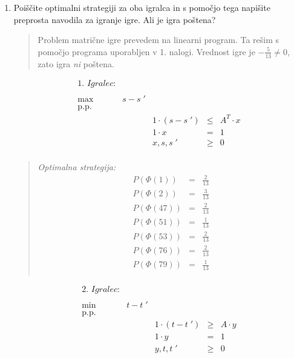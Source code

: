 \documentclass{article}
\begin{document}
\begin{enumerate}[label=\alph*)]
\item Poiščite optimalni strategiji za oba igralca in s pomočjo tega napišite preprosta
navodila za igranje igre. Ali je igra poštena?
    \begin{quote} 
    Problem matrične igre prevedem na linearni program. Ta rešim s pomočjo programa uporabljen v 1. nalogi. Vrednost igre je $-\frac{5}{13}\neq0$, zato igra \textit{ni} poštena.
    \end{quote}
\begin{center}
\begin{minipage}[t][4.5cm][t]{0.45\textwidth} %
\vspace{0pt} %
$$
\begin{array}{rrlll}{\textit{1. Igralec:}} \\\\
    \text{max} & s - s\;'&\\
    \text{p.p.} \\
    & & 1 \cdot (s-s\;') & \leq & A^T \cdot x \\
    & & 1 \cdot x & = & 1 \\
    & & x, s, s\;' & \ge &0 \\
\end{array}
$$

\begin{quote}
    \textit{Optimalna strategija:}
    \begingroup
    \setlength{\tabcolsep}{10pt} %
    \renewcommand{\arraystretch}{1.5} %
    $$
    \begin{array}{lcc}
    P(\Phi(1)) & = & \frac{2}{13} \\
    P(\Phi(2)) & = & \frac{3}{13} \\
    P(\Phi(47)) & = & \frac{2}{13} \\
    P(\Phi(51)) & = & \frac{1}{13} \\
    P(\Phi(53)) & = & \frac{2}{13} \\
    P(\Phi(76)) & = & \frac{2}{13} \\
    P(\Phi(79)) & = & \frac{1}{13} \\
    \end{array}
    $$
    \endgroup
    \end{quote}
\end{minipage}
\hfill
\begin{minipage}[t][4.5cm][t]{0.45\textwidth} %
\vspace{0pt} %
$$
\begin{array}{rrlll}{\textit{2. Igralec:}} \\\\
    \text{min} & t - t\;'&\\
    \text{p.p.} \\
    & & 1 \cdot (t-t\;') & \ge & A \cdot y \\
    & & 1 \cdot y & = & 1 \\
    & & y, t, t\;' & \ge &0 \\
\end{array}
$$


\end{minipage}
\end{center}
\end{enumerate}
\end{document}
